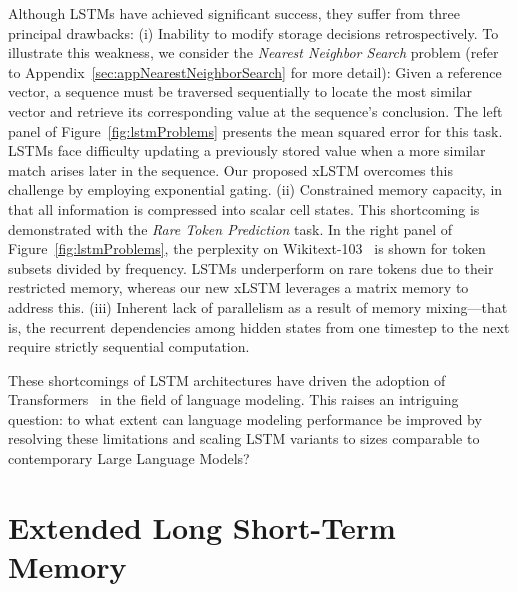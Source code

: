 Although LSTMs have achieved significant success, they suffer from three principal drawbacks: (i) Inability to modify storage decisions retrospectively. To illustrate this weakness, we consider the {\it Nearest Neighbor Search} problem (refer to Appendix~\ref{sec:appNearestNeighborSearch} for more detail): Given a reference vector, a sequence must be traversed sequentially to locate the most similar vector and retrieve its corresponding value at the sequence’s conclusion. The left panel of Figure~\ref{fig:lstmProblems} presents the mean squared error for this task. LSTMs face difficulty updating a previously stored value when a more similar match arises later in the sequence. Our proposed xLSTM overcomes this challenge by employing exponential gating. (ii) Constrained memory capacity, in that all information is compressed into scalar cell states. This shortcoming is demonstrated with the {\it Rare Token Prediction} task. In the right panel of Figure~\ref{fig:lstmProblems}, the perplexity on Wikitext-103~\citep{Merity:17} is shown for token subsets divided by frequency. LSTMs underperform on rare tokens due to their restricted memory, whereas our new xLSTM leverages a matrix memory to address this. (iii) Inherent lack of parallelism as a result of memory mixing—that is, the recurrent dependencies among hidden states from one timestep to the next require strictly sequential computation. 

These shortcomings of LSTM architectures have driven the adoption of Transformers~\citep{Vaswani:17} in the field of language modeling. This raises an intriguing question: to what extent can language modeling performance be improved by resolving these limitations and scaling LSTM variants to sizes comparable to contemporary Large Language Models?

\section{Extended Long Short-Term Memory}
\label{sec:xLSTM}

